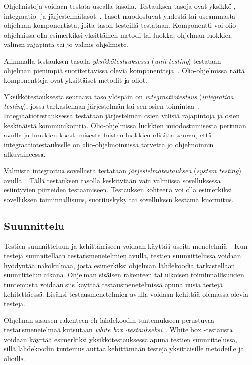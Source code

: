 \documentclass[finnish, grading]{tktltiki2}
\theoremstyle{definition}
\theoremstyle{remark}
\begin{document}
Ohjelmistoja voidaan testata usealla tasolla. Testauksen tasoja ovat yksikkö-, integraatio- ja järjestelmätasot~\cite[s. 45]{Binder:1999}. Tasot muodostuvat yhdestä tai useammasta ohjelman komponentista, joita tason testeillä testataan. Komponentti voi olio-ohjelmissa olla esimerkiksi yksittäinen metodi tai luokka, ohjelman luokkien välinen rajapinta tai jo valmis ohjelmisto.

Alimmalla testauksen tasolla \textit{yksikkötestauksessa} (\textit{unit testing}) testataan ohjelman pienimpiä suoritettavissa olevia komponentteja~\cite[s. 45]{Binder:1999}. Olio-ohjelmissa näitä komponentteja ovat yksittäiset metodit ja oliot.

Yksikkötestauksesta seuraava taso ylöspäin on \textit{integraatiotestaus} (\textit{integration testing}), jossa tarkastellaan järjestelmän tai sen osien toimintaa~\cite[s. 45]{Binder:1999}. Integraatiotestauksessa testataan järjestelmän osien välisiä rajapintoja ja osien keskinäistä kommunikointia. Olio-ohjelmissa luokkien muodostumisesta perinnän avulla ja luokkien koostumisesta toisten luokkien olioista seuraa, että integraatiotestaukselle on olio-ohjelmoinnissa tarvetta jo ohjelmoinnin alkuvaiheessa.

Valmista integroitua sovellusta testataan \textit{järjestelmätestauksen} (\textit{system testing}) avulla~\cite[s. 45]{Binder:1999}. Tällä testauksen tasolla keskitytään vain valmiissa sovelluksessa esiintyvien piirteiden testaamiseen. Testauksen kohteena voi olla esimerkiksi sovelluksen toiminnallisuus, suorituskyky tai sovelluksen kestämä kuormitus.

\subsection{Suunnittelu}

Testien suunnitteluun ja kehittämiseen voidaan käyttää useita menetelmiä~\cite[s. 51]{Binder:1999}. Kun testejä suunnitellaan testausmenetelmien avulla, testien suunnittelussa voidaan hyödyntää näkökulmaa, josta esimerkiksi ohjelman lähdekoodia tarkastellaan suunnittelun aikana. Ohjelman sisäisen rakenteen tai ulkoisen toiminnallisuuden tuntemusta voidaan siis käyttää testausmenetelmissä apuna uusia testejä kehitettäessä. Lisäksi testausmenetelmien avulla voidaan kehittää olemassa olevia testejä.

Ohjelman sisäisen rakenteen eli lähdekoodin tuntemukseen perustuvaa testausmenetelmää kutsutaan \textit{white box -testaukseksi}~\cite[s. 52]{Binder:1999}. White box -testausta voidaan käyttää esimerkiksi yksikkötestauksessa apuna testien suunnittelussa, sillä lähdekoodin tuntemus auttaa kehittämään testejä yksittäisille metodeille ja olioille.
\end{document}
